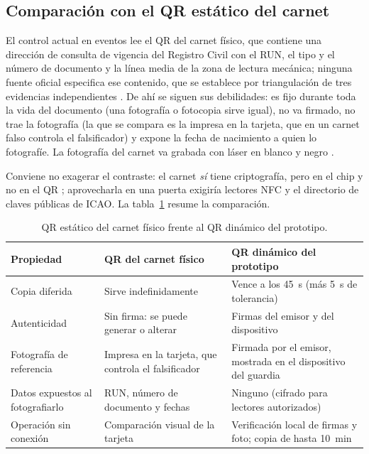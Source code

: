\subsection{Comparación con el QR estático del carnet}
\label{sec:prototipo-carnet}

El control actual en eventos lee el QR del carnet físico, que contiene una dirección de consulta de
vigencia del Registro Civil con el RUN, el tipo y el número de documento y la línea media de la
zona de lectura mecánica; ninguna fuente oficial especifica ese contenido, que se establece por
triangulación de tres evidencias independientes \cite{PENDIENTE-docstatus}. De ahí se siguen sus
debilidades: es fijo durante toda la vida del documento (una fotografía o fotocopia sirve igual),
no va firmado, no trae la fotografía (la que se compara es la impresa en la tarjeta, que en un
carnet falso controla el falsificador) y expone la fecha de nacimiento a quien lo fotografíe. La
fotografía del carnet va grabada con láser en blanco y negro \cite{srcei_resolucion466_2024}.

Conviene no exagerar el contraste: el carnet \emph{sí} tiene criptografía, pero en el chip y no en
el QR \cite{srcei_resolucion466_2024}; aprovecharla en una puerta exigiría lectores NFC y el
directorio de claves públicas de ICAO. La tabla~\ref{tab:prototipo-carnet} resume la comparación.

\begin{table}[htbp]
  \centering
  \small
  \begin{tabular}{p{3.6cm}p{4.9cm}p{5.0cm}}
    \toprule
    Propiedad & QR del carnet físico & QR dinámico del prototipo \\
    \midrule
    Copia diferida & Sirve indefinidamente & Vence a los 45~s (más 5~s de tolerancia) \\
    Autenticidad & Sin firma: se puede generar o alterar & Firmas del emisor y del dispositivo \\
    Fotografía de referencia & Impresa en la tarjeta, que controla el falsificador & Firmada por el emisor, mostrada en el dispositivo del guardia \\
    Datos expuestos al fotografiarlo & RUN, número de documento y fechas & Ninguno (cifrado para lectores autorizados) \\
    Operación sin conexión & Comparación visual de la tarjeta & Verificación local de firmas y foto; copia de hasta 10~min \\
    \bottomrule
  \end{tabular}
  \caption{QR estático del carnet físico frente al QR dinámico del prototipo.}
  \label{tab:prototipo-carnet}
\end{table}

